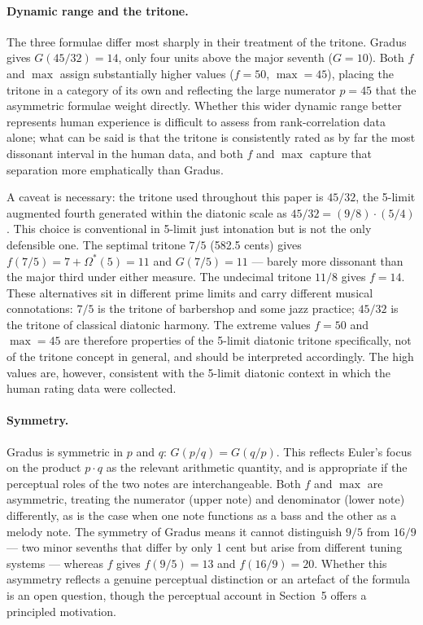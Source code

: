\documentclass[11pt,a4paper]{article}
\newcommand{\Os}{\Omega^{*}}
\begin{document}
\paragraph{Dynamic range and the tritone.}
The three formulae differ most sharply in their treatment of the tritone. Gradus
gives $G(45/32) = 14$, only four units above the major seventh ($G = 10$).
Both $f$ and $\max$ assign substantially higher values ($f = 50$, $\max = 45$),
placing the tritone in a category of its own and reflecting the large
numerator $p = 45$ that the asymmetric formulae weight directly. Whether this
wider dynamic range better represents human experience is difficult to assess
from rank-correlation data alone; what can be said is that the tritone is
consistently rated as by far the most dissonant interval in the human data,
and both $f$ and $\max$ capture that separation more emphatically than Gradus.

A caveat is necessary: the tritone used throughout this paper is $45/32$, the
5-limit augmented fourth generated within the diatonic scale as
$45/32 = (9/8) \cdot (5/4)$. This choice is conventional in 5-limit just
intonation but is not the only defensible one. The septimal tritone $7/5$
(582.5 cents) gives $f(7/5) = 7 + \Os(5) = 11$ and $G(7/5) = 11$ --- barely
more dissonant than the major third under either measure. The undecimal tritone
$11/8$ gives $f = 14$. These alternatives sit in different prime limits and
carry different musical connotations: $7/5$ is the tritone of barbershop and
some jazz practice; $45/32$ is the tritone of classical diatonic harmony.
The extreme values $f = 50$ and $\max = 45$ are therefore properties of the
5-limit diatonic tritone specifically, not of the tritone concept in general,
and should be interpreted accordingly. The high values are, however,
consistent with the 5-limit diatonic context in which the human rating data
were collected.

\paragraph{Symmetry.}
Gradus is symmetric in $p$ and $q$: $G(p/q) = G(q/p)$. This reflects Euler's
focus on the product $p \cdot q$ as the relevant arithmetic quantity, and is
appropriate if the perceptual roles of the two notes are interchangeable.
Both $f$ and $\max$ are asymmetric, treating the numerator (upper note) and
denominator (lower note) differently, as is the case when one note functions
as a bass and the other as a melody note. The symmetry of Gradus means it
cannot distinguish $9/5$ from $16/9$ --- two minor sevenths that differ by
only 1 cent but arise from different tuning systems --- whereas $f$ gives
$f(9/5) = 13$ and $f(16/9) = 20$. Whether this asymmetry reflects a genuine
perceptual distinction or an artefact of the formula is an open question,
though the perceptual account in Section~5 offers a principled motivation.
\end{document}
